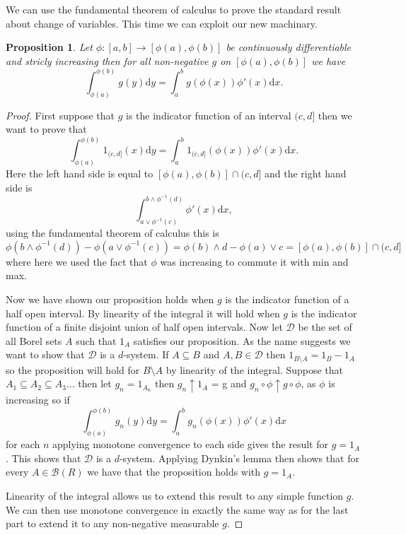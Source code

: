 \documentclass[11pt]{article}
\newtheorem{prp}[thm]{Proposition}
\theoremstyle{definition}
\theoremstyle{remark}
\begin{document}
We can use the fundamental theorem of calculus to prove the standard result about change of variables. This time we can exploit our new machinary. 
\begin{prp}
Let $\phi: [a,b] \rightarrow [\phi(a), \phi(b)]$ be continuously differentiable and stricly increasing then for all non-negative $g$ on $[\phi(a), \phi(b)]$ we have
\[ \int_{\phi(a)}^{\phi(b)}g(y) \mathrm{d}y = \int_a^b g(\phi(x)) \phi'(x) \mathrm{d}x. \]
\end{prp}
\begin{proof}
First suppose that $g$ is the indicator function of an interval $(c,d]$ then we want to prove that
\[ \int_{\phi(a)}^{\phi(b)} 1_{(c,d]}(x) \mathrm{d}y = \int_a^b  1_{(c,d]}(\phi(x)) \phi'(x) \mathrm{d}x.\] Here the left hand side is equal to $[\phi(a), \phi(b)] \cap (c,d]$ and the right hand side is 
\[ \int_{a \vee \phi^{-1}(c)}^{b \wedge \phi^{-1}(d)} \phi'(x) \mathrm{d}x,\] using the fundamental theorem of calculus this is
\[ \phi(b \wedge \phi^{-1}(d)) - \phi(a \vee \phi^{-1}(c)) = \phi(b) \wedge d - \phi(a) \vee c = [\phi(a), \phi(b)] \cap (c,d] \] where here we used the fact that $\phi$ was increasing to commute it with min and max.

Now we have shown our proposition holds when $g$ is the indicator function of a half open interval. By linearity of the integral it will hold when $g$ is the indicator function of a finite disjoint union of half open intervals. Now let $\mathcal{D}$ be the set of all  Borel sets $A$ such that $1_A$ satisfies our proposition. As the name suggests we want to show that $\mathcal{D}$ is a $d$-system. If $A \subseteq B$ and $A, B \in \mathcal{D}$ then $1_{B \setminus A} = 1_B - 1_A$ so the proposition will hold for $B \setminus A$ by linearity of the integral. Suppose that $A_1 \subseteq A_2 \subseteq A_3 \dots$ then let $g_n=1_{A_n}$ then $g_n \uparrow 1_A$ = g and $g_n \circ \phi \uparrow g \circ \phi$, as $\phi$ is increasing so if 
\[ \int_{\phi(a)}^{\phi(b)}g_n(y) \mathrm{d}y = \int_a^b g_n(\phi(x)) \phi'(x) \mathrm{d}x \] for each $n$ applying monotone convergence to each side gives the result for $g = 1_A$. This shows that $\mathcal{D}$ is a $d$-system. Applying Dynkin's lemma then shows that for every $A \in \mathcal{B}(R)$ we have that the proposition holds with $g=1_A$.

Linearity of the integral allows us to extend this result to any simple function $g$. We can then use monotone convergence in exactly the same way as for the last part to extend it to any non-negative measurable $g$.
\end{proof}
\end{document}
